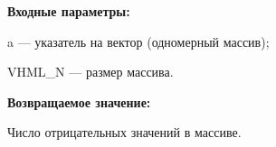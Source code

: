 \textbf{Входные параметры:}

 a --- указатель на вектор (одномерный массив);
 
 VHML\_N --- размер массива.

\textbf{Возвращаемое значение:}

 Число отрицательных значений в массиве.